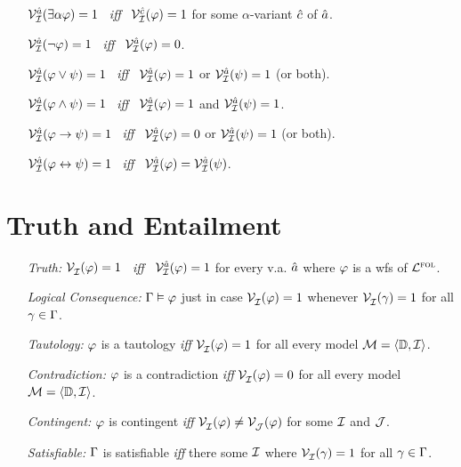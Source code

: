 \documentclass[a4paper, 11pt]{article} %
\begin{document}
\begin{itemize}
  \item[] $\mathcal{V}_{\mathcal{I}}^{\hat{a}}(\exists\alpha\varphi)=1$ ~\textit{iff}~ $\mathcal{V}_{\mathcal{I}}^{\hat{c}}(\varphi)=1$ for some $\alpha$-variant $\hat{c}$ of $\hat{a}$.
  \item[] $\mathcal{V}_{\mathcal{I}}^{\hat{a}}(\neg\varphi)=1$ ~\textit{iff}~ $\mathcal{V}_{\mathcal{I}}^{\hat{a}}(\varphi)=0$.
  \item[] $\mathcal{V}_{\mathcal{I}}^{\hat{a}}(\varphi \vee \psi)=1$ ~\textit{iff}~ $\mathcal{V}_{\mathcal{I}}^{\hat{a}}(\varphi)=1$ or $\mathcal{V}_{\mathcal{I}}^{\hat{a}}(\psi)=1$ (or both).
  \item[] $\mathcal{V}_{\mathcal{I}}^{\hat{a}}(\varphi \wedge \psi)=1$ ~\textit{iff}~ $\mathcal{V}_{\mathcal{I}}^{\hat{a}}(\varphi)=1$ and $\mathcal{V}_{\mathcal{I}}^{\hat{a}}(\psi)=1$.
  \item[] $\mathcal{V}_{\mathcal{I}}^{\hat{a}}(\varphi \rightarrow \psi)=1$ ~\textit{iff}~ $\mathcal{V}_{\mathcal{I}}^{\hat{a}}(\varphi)=0$ or $\mathcal{V}_{\mathcal{I}}^{\hat{a}}(\psi)=1$ (or both).
  \item[] $\mathcal{V}_{\mathcal{I}}^{\hat{a}}(\varphi \leftrightarrow \psi)=1$ ~\textit{iff}~ $\mathcal{V}_{\mathcal{I}}^{\hat{a}}(\varphi)=\mathcal{V}_{\mathcal{I}}^{\hat{a}}(\psi)$.
\end{itemize}



\section*{Truth and Entailment}

\begin{enumerate}
  \item[\it Truth:] $\mathcal{V}_{\mathcal{I}}^{}(\varphi)=1$ ~\textit{iff}~ $\mathcal{V}_{\mathcal{I}}^{\hat{a}}(\varphi)=1$ for every v.a. $\hat{a}$ where $\varphi$ is a wfs of $\mathcal{L}^{\textsc{fol}}$. 
  \item[\it Logical Consequence:] $\Gamma\vDash\varphi$ just in case $\mathcal{V}_{\mathcal{I}}^{}(\varphi) = 1$ whenever $\mathcal{V}_{\mathcal{I}}^{}(\gamma) = 1$ for all $\gamma \in \Gamma$.
  \item[\it Tautology:] $\varphi$ is a tautology \textit{iff} $\mathcal{V}_{\mathcal{I}}^{}(\varphi) = 1$ for all every model $\mathcal{M} = \langle\mathbb{D}, \mathcal{I}\rangle$.
  \item[\it Contradiction:] $\varphi$ is a contradiction \textit{iff} $\mathcal{V}_{\mathcal{I}}^{}(\varphi) = 0$ for all every model $\mathcal{M} = \langle\mathbb{D}, \mathcal{I}\rangle$.
  \item[\it Contingent:] $\varphi$ is contingent \textit{iff} $\mathcal{V}_{\mathcal{I}}^{}(\varphi) \neq \mathcal{V}_{\mathcal{J}}^{}(\varphi)$ for some $\mathcal{I}$ and $\mathcal{J}$.
  \item[\it Satisfiable:] $\Gamma$ is satisfiable \textit{iff} there some $\mathcal{I}$ where $\mathcal{V}_{\mathcal{I}}^{}(\gamma) = 1$ for all $\gamma \in \Gamma$.
\end{enumerate}
\end{document}
